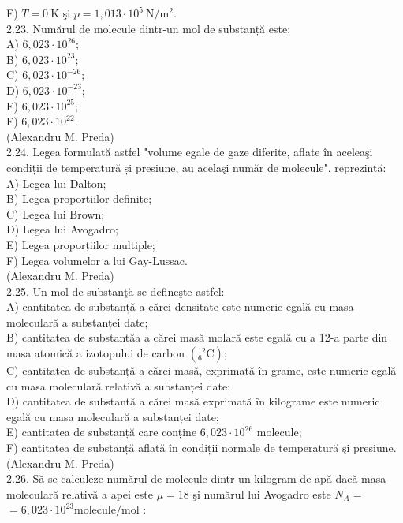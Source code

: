 \documentclass[10pt]{article}
\begin{document}
F) $T=0 \mathrm{~K}$ şi $p=1,013 \cdot 10^{5} \mathrm{~N} / \mathrm{m}^{2}$.\\
2.23. Numărul de molecule dintr-un mol de substanță este:\\
A) $6,023 \cdot 10^{26}$;\\
B) $6,023 \cdot 10^{23}$;\\
C) $6,023 \cdot 10^{-26}$;\\
D) $6,023 \cdot 10^{-23}$;\\
E) $6,023 \cdot 10^{25}$;\\
F) $6,023 \cdot 10^{22}$.\\
(Alexandru M. Preda)\\
2.24. Legea formulată astfel "volume egale de gaze diferite, aflate în aceleaşi condiții de temperatură și presiune, au acelaşi număr de molecule", reprezintă:\\
A) Legea lui Dalton;\\
B) Legea proporțiilor definite;\\
C) Legea lui Brown;\\
D) Legea lui Avogadro;\\
E) Legea proporțiilor multiple;\\
F) Legea volumelor a lui Gay-Lussac.\\
(Alexandru M. Preda)\\
2.25. Un mol de substanţă se defineşte astfel:\\
A) cantitatea de substanță a cărei densitate este numeric egală cu masa moleculară a substanței date;\\
B) cantitatea de substantăa a cărei masă molară este egală cu a 12-a parte din masa atomică a izotopului de carbon $\left({ }_{6}^{12} \mathrm{C}\right)$;\\
C) cantitatea de substanță a cărei masă, exprimată în grame, este numeric egală cu masa moleculară relativă a substanței date;\\
D) cantitatea de substantă a cărei masă exprimată în kilograme este numeric egală cu masa moleculară a substanței date;\\
E) cantitatea de substanță care conține $6,023 \cdot 10^{26}$ molecule;\\
F) cantitatea de substanță aflată în condiții normale de temperatură şi presiune.\\
(Alexandru M. Preda)\\
2.26. Să se calculeze numărul de molecule dintr-un kilogram de apă dacă masa moleculară relativă a apei este $\mu=18$ şi numărul lui Avogadro este $N_{A}=$ $=6,023 \cdot 10^{23} \mathrm{molecule} / \mathrm{mol}$ :\\
\end{document}
